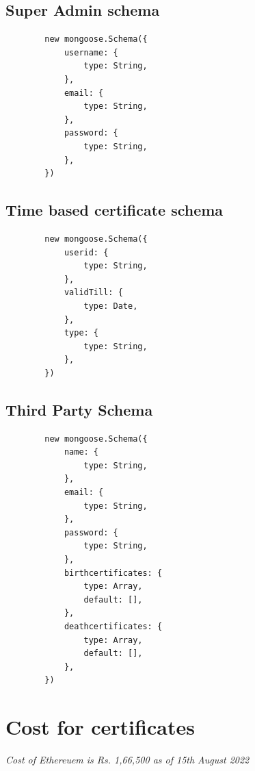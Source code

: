     \subsection{Super Admin schema}
    \begin{lstlisting}
        new mongoose.Schema({
            username: {
                type: String,
            },
            email: {
                type: String,
            },
            password: {
                type: String,
            },
        })
    \end{lstlisting}

    \subsection{Time based certificate schema}
    \begin{lstlisting}
        new mongoose.Schema({
            userid: {
                type: String,
            },
            validTill: {
                type: Date,
            },
            type: {
                type: String,
            },
        })
    \end{lstlisting}

    \subsection{Third Party Schema}
    \begin{lstlisting}
        new mongoose.Schema({
            name: {
                type: String,
            },
            email: {
                type: String,
            },
            password: {
                type: String,
            },
            birthcertificates: {
                type: Array,
                default: [],
            },
            deathcertificates: {
                type: Array,
                default: [],
            },
        })
    \end{lstlisting}    

\section{Cost for certificates}

\textit{Cost of Ethereuem is Rs. 1,66,500 as of 15th August 2022}

